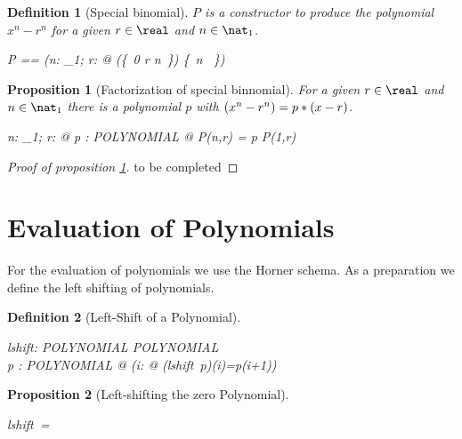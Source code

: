 \documentclass[12pt]{scrartcl}
\newtheorem{prop}{Proposition}[section]
\newtheorem{zdef}{Definition}[section]
\begin{document}
\begin{zdef}[Special binomial]
  \label{zdef:special-binnomial}
  $P$ is a constructor to produce the polynomial $x^n - r^n$ for a
  given $r \in \real$ and $n \in \nat_1$.
  \begin{zed}
    P == (\lambda n: \nat_1; r: \real @ (\zeropol \oplus \{~0 \mapsto
    r \apwr n~\}) \oplus \{~n \mapsto \aone ~\})
  \end{zed}
\end{zdef}

\begin{prop}[Factorization of special binnomial]
  \label{prop:factorization-binomial}
  For a given $r \in \real$ and $n \in \nat_1$ there is a polynomial
  $p$ with $(x^n-r^n) = p * (x - r)$.
  \begin{zed}
    \forall n: \nat_1; r: \real @ \exists p : POLYNOMIAL @ P(n,r) = p
    \polymult P(1,r)
  \end{zed}
\end{prop}

\begin{proof}[Proof of proposition \ref{prop:factorization-binomial}]
  to be completed
\end{proof}

\section{Evaluation of Polynomials}
\label{sec:evaluation}

For the evaluation of polynomials we use the Horner schema. As a
preparation we define the left shifting of polynomials.
 
\begin{zdef}[Left-Shift of a Polynomial]
  \label{zdef:left-shift}
  \begin{axdef}
    lshift: POLYNOMIAL \fun POLYNOMIAL \\
    \where
    \forall p : POLYNOMIAL @ (\forall i: \nat @ (lshift~p)(i)=p(i+1))
  \end{axdef}
\end{zdef}

\begin{prop}[Left-shifting the zero Polynomial]
  \label{prop:left-shift-zero-polynomial}
  \begin{zed}
    lshift~\zeropol = \zeropol
  \end{zed}
\end{prop}
\end{document}
